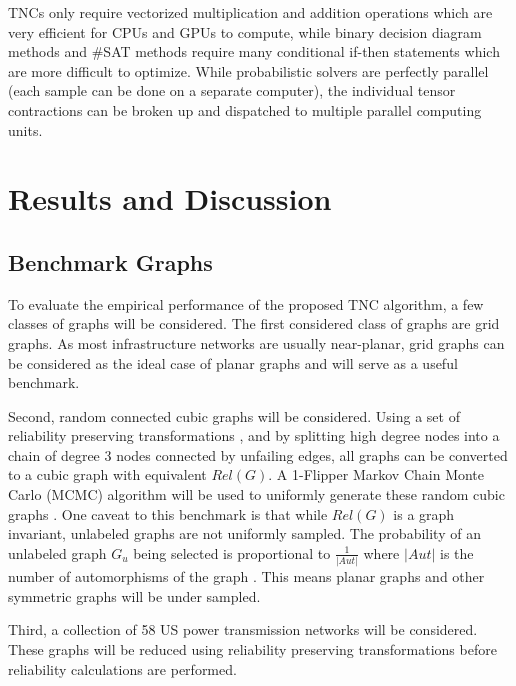 TNCs only require vectorized multiplication and addition operations which are very efficient for CPUs and GPUs to compute, while binary decision diagram methods and \#SAT methods require many conditional if-then statements which are more difficult to optimize. While probabilistic solvers are perfectly parallel (each sample can be done on a separate computer), the individual tensor contractions can be broken up and dispatched to multiple parallel computing units.

\hypertarget{results-and-discussion}{%
\section{Results and Discussion}\label{results-and-discussion}}

\hypertarget{benchmark-graphs}{%
\subsection{Benchmark Graphs}\label{benchmark-graphs}}

To evaluate the empirical performance of the proposed TNC algorithm, a few classes of graphs will be considered. The first considered class of graphs are grid graphs. As most infrastructure networks are usually near-planar, grid graphs can be considered as the ideal case of planar graphs and will serve as a useful benchmark.

Second, random connected cubic graphs will be considered. Using a set of reliability preserving transformations \cite{shooman1991exact}, and by splitting high degree nodes into a chain of degree 3 nodes connected by unfailing edges, all graphs can be converted to a cubic graph with equivalent \(Rel(G)\). A 1-Flipper Markov Chain Monte Carlo (MCMC) algorithm will be used to uniformly generate these random cubic graphs \cite{feder2006local}. One caveat to this benchmark is that while \(Rel(G)\) is a graph invariant, unlabeled graphs are not uniformly sampled. The probability of an unlabeled graph \(G_u\) being selected is proportional to \(\frac{1}{|Aut|}\) where \(|Aut|\) is the number of automorphisms of the graph \cite{fosdick2018configuring}. This means planar graphs \cite{mcdiarmid2005random} and other symmetric graphs will be under sampled.

Third, a collection of 58 US power transmission networks \cite{li2016characterizing} will be considered. These graphs will be reduced using reliability preserving transformations before reliability calculations are performed.

